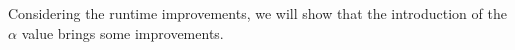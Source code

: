 \documentclass[]{article}
\begin{document}
Considering the runtime improvements, we will show that the introduction of the $\alpha$ value brings some improvements. 


\begin{comment}

\subsubsection{Binary Search with improved guessing}

As we can see in \ref{algo:cut}, the initial guess of the cut is simply the center of the domain. But if we consider non uniform distributions, this initial guess can possibly rather bad. Let us consider the following example:

\begin{figure}[H]
	\begin{center}
		\begin{tikzpicture}
			\def\mean{0.1}
			\def\sigma{0.1}
			\def\pi{3.14159265359}
			\begin{axis}[xmin = 0, xmax = 1, ymin=0, ymax=5, samples=60]
				\addplot[domain = 0:1,blue] {1 / (\sigma * sqrt(2 * \pi)) * exp(-0.5 * ((x - \mean) / \sigma)^2) };
				\draw (axis cs:0.5,0) -- node[left]{$c_0$} (axis cs:0.5,5);
				\draw (axis cs:0.25,0) -- node[left]{$c_1$} (axis cs:0.25,5);
				\draw (axis cs:0.125,0) -- node[left]{$c_2$} (axis cs:0.125,5);
			\end{axis}
		\end{tikzpicture}
	\end{center}
	\caption{3 iterations of binary search with naive initial guess}\label{euclid}
\end{figure}

The underlying distribution is a normal distribution. \TODO{Add reference to section about data}. We can see that the algorithm will have to sweep 3 times over the entire array to get into the region of the actual median. One suggestion for improvement is to use an approximated median as a guess for the first split. We can sample 100 particles and find their median in constant time. Then we will run the binary cut algorithm using the approximated median as an initial guess. This can reduce the runtime by a few iterations, however we cannot make any assessment about the runtime, as this improvement will make the algorithm even slower on some distributions. Let us for example consider the uniform distribution, in this case the addition is pure overhead as the center is already the most accurate initial guess.
\end{comment}
\end{document}
